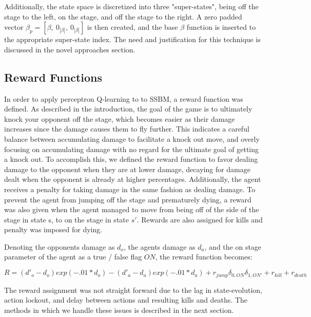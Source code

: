 Additionally, the state space is discretized into three "super-states", being off the stage to the left, on the stage, and off the stage to the right. A zero padded vector $\beta_{p} = [\beta,~0_{|\beta|},~0_{|\beta|}]$ is then created, and the base $\beta$ function is inserted to the appropriate super-state index. The need and  justification for this technique is discussed in the novel approaches section.

\subsection{Reward Functions}

In order to apply perceptron Q-learning to to SSBM, a reward function was defined. As described in the introduction, the goal of the game is to ultimately knock your opponent off the stage, which becomes easier as their damage increases since the damage causes them to fly further. This indicates a careful balance between accumulating damage to facilitate a knock out move, and overly focusing on accumulating damage with no regard for the ultimate goal of getting a knock out. To accomplish this, we defined the reward function to favor dealing damage to the opponent when they are at lower damage, decaying for damage dealt when the opponent is already at higher percentages. Additionally, the agent receives a penalty for taking damage in the same fashion as dealing damage. To prevent the agent from jumping off the stage and prematurely dying, a reward was also given when the agent managed to move from being off of the side of the stage in state s, to on the stage in state $s'$. Rewards are also assigned for kills and penalty was imposed for dying.

Denoting the opponents damage as $d_o$, the agents damage as $d_a$, and the on stage parameter of the agent as a true / false flag $ON$, the reward function becomes:

$$R = (d'_o-d_o)exp(-.01*d_o) - (d'_a-d_a)exp(-.01*d_a) + r_{jump}\delta_{0,ON}\delta_{1,ON'}  + r_{kill} + r_{death}$$

The reward assignment was not straight forward due to the lag in state-evolution, action lockout, and delay between actions and resulting kills and deaths. The methods in which we handle these issues is described in the next section.
